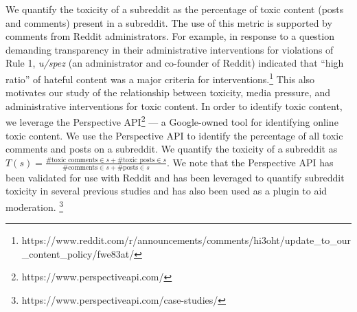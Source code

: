  We quantify the toxicity of
a subreddit as the percentage of toxic content (posts and comments) present in
a subreddit. The use of this metric is supported by comments from Reddit
administrators. For example, in response to a question demanding transparency
in their administrative interventions for violations of Rule 1, \emph{u/spez}
(an administrator and co-founder of Reddit) indicated that ``high ratio'' of
hateful content was a major criteria for
interventions.\footnote{https://www.reddit.com/r/announcements/comments/hi3oht/update\_to\_our\_content\_policy/fwe83at/}
This also motivates our study of the relationship between toxicity, media
pressure, and administrative interventions for toxic content. In order to
identify toxic content, we leverage the Perspective
API\footnote{https://www.perspectiveapi.com/} --- a Google-owned tool for
identifying online toxic content. We use the Perspective API to identify
the percentage of all toxic comments and posts on a subreddit. We quantify the
toxicity of a subreddit as $T(s) = \frac{\text{\# toxic comments} \in
s + \text{\# toxic posts} \in s}{\text{\# comments} \in s + \text{\# posts} \in
s}$. We note that the Perspective API has been validated for use with Reddit
and has been leveraged to quantify subreddit toxicity in several previous
studies  \cite{mittos2020and, zannettou2020measuring} and has also been used as
a plugin to aid moderation.
\footnote{https://www.perspectiveapi.com/case-studies/}

